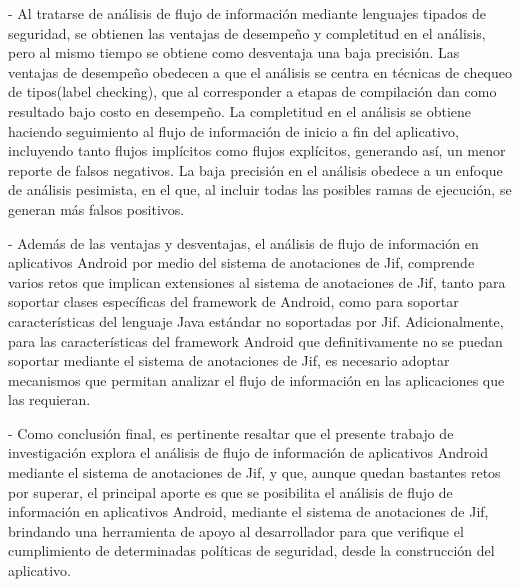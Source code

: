 - Al tratarse de análisis de flujo de información mediante lenguajes tipados de
seguridad, se obtienen las ventajas de desempeño y completitud en el análisis,
pero al mismo tiempo se obtiene como desventaja una baja precisión.\newline 
Las ventajas de desempeño obedecen a que el análisis se centra en técnicas de
chequeo de tipos(label checking), que al corresponder a etapas de compilación
dan como resultado bajo costo en desempeño.\newline
La completitud en el análisis se obtiene  haciendo seguimiento al flujo de
información de inicio a fin del aplicativo\cite{LanguageIFS-2013}, incluyendo
tanto flujos implícitos como flujos explícitos, generando así, un menor 
reporte de falsos negativos.\newline 
La baja precisión en el análisis obedece a
un enfoque de análisis pesimista, en el que, al incluir todas las posibles ramas de ejecución, se generan más
falsos positivos.

- Además de las ventajas y desventajas, el análisis de flujo de información en
aplicativos Android por medio del sistema de anotaciones de Jif,
comprende varios retos que implican extensiones al sistema de anotaciones de
Jif, tanto para soportar clases específicas del framework de Android, como para
soportar características del lenguaje Java estándar no soportadas por Jif.\newline 
Adicionalmente, para las características del framework Android que
definitivamente no se puedan soportar mediante el sistema de anotaciones de Jif,
es necesario adoptar mecanismos que permitan analizar el flujo de información en
las aplicaciones que las requieran.

- Como conclusión final, es pertinente resaltar que el presente trabajo de
investigación explora el análisis de flujo de información de aplicativos Android
mediante el sistema de anotaciones de Jif, y que,  aunque quedan bastantes retos
por superar, el principal aporte es que se posibilita el análisis de flujo de
información en aplicativos Android, mediante el sistema de anotaciones de Jif,
brindando una herramienta de apoyo al desarrollador para que verifique el
cumplimiento de determinadas políticas de seguridad, desde la construcción del
aplicativo.
